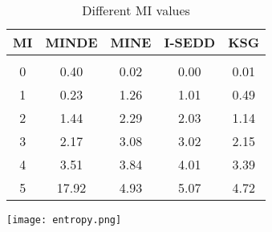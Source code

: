 \begin{table}[t]
\begin{center}

\begin{minipage}{0.45\textwidth}
\tiny

    \centering
    \caption{Different MI values}
    \begin{tabular}{c|cccc}
        \multicolumn{1}{c}{\bf MI} & \multicolumn{1}{c}{\bf MINDE} & \multicolumn{1}{c}{\bf MINE} & \multicolumn{1}{c}{\bf I-SEDD} & \multicolumn{1}{c}{\bf KSG} \\ 
        \hline \\
        0 & 0.40 & 0.02 & 0.00 & 0.01 \\
        1 & 0.23 & 1.26 & 1.01 & 0.49 \\
        2 & 1.44 & 2.29 & 2.03 & 1.14 \\
        3 & 2.17 & 3.08 & 3.02 & 2.15 \\
        4 & 3.51 & 3.84 & 4.01 & 3.39 \\
        5 & 17.92 & 4.93 & 5.07 & 4.72 \\
    \end{tabular}
    \label{tab:mi_estimators}
\end{minipage}
\hfill
\begin{minipage}{0.45\textwidth}
\texttt{[image: entropy.png]}
\label{fig:ising}
\end{minipage}


\end{center}
\vspace{1em} %
\end{table}
